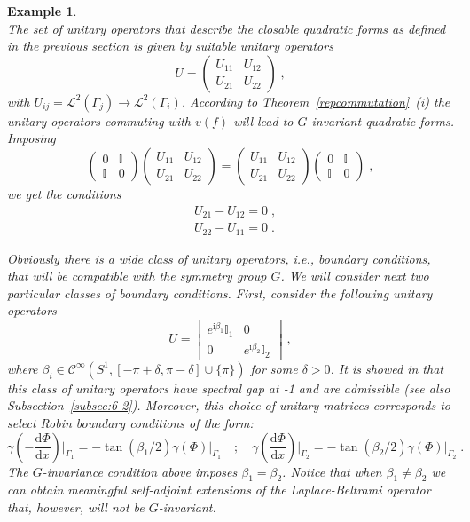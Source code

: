 \documentclass[a4paper,12pt]{amsart}
\renewcommand{\L}{\mathcal{L}}
\renewcommand{\d}{\mathrm{d}}
\newcommand{\C}{\mathcal{C}}
\newcommand{\1}{\mathbb{I}}
\newtheorem{example}[theorem]{Example}
\numberwithin{equation}{section}
\numberwithin{theorem}{section}
\begin{document}
\begin{example}
\[\]
The set of unitary operators that describe the closable quadratic forms as defined in the previous section 
is given by suitable unitary operators 
$$U=\begin{pmatrix} U_{11} & U_{12} \\ U_{21} & U_{22} \end{pmatrix}\;,$$ 
with $U_{ij}=\L^2(\Gamma_j)\to\L^2(\Gamma_i)$. 
According to Theorem~\ref{repcommutation}~(i) the unitary operators commuting 
with $v (f)$ will lead to $G$-invariant quadratic forms. Imposing
$$\begin{pmatrix} 0 & \mathbb{I} \\ \mathbb{I} & 0\end{pmatrix}
\begin{pmatrix} U_{11} & U_{12} \\ U_{21} & U_{22} \end{pmatrix}=\begin{pmatrix} U_{11} & U_{12} \\ U_{21} & U_{22} 
\end{pmatrix}\begin{pmatrix} 0 & \mathbb{I} \\ \mathbb{I} & 0\end{pmatrix}\;,$$
we get the conditions
\begin{align*}
&U_{21}-U_{12}=0\;,\\
&U_{22}-U_{11}=0\;.
\end{align*}

Obviously there is a wide class of unitary operators, i.e., boundary conditions, that will be compatible with the symmetry group $G$. 
We will consider next two particular classes of boundary conditions. 
First, consider the following unitary operators 
\begin{equation}
U=\begin{bmatrix} e^{\mathrm{i}\beta_1}\mathbb{I}_1 & 0\\ 0 & e^{\mathrm{i}\beta_2}\mathbb{I}_2 \end{bmatrix}\;,
\end{equation}
where $\beta_i\in\C^\infty\left(S^1,[-\pi+\delta,\pi-\delta]\cup\{\pi\}\right)$ for some $\delta>0$. It is showed in 
\cite[Sections~3 and 5]{ILP13} that this class of 
unitary operators have spectral gap at -1 and are admissible (see also Subsection~\ref{subsec:6-2}). 
Moreover, this choice of unitary matrices corresponds to select Robin 
boundary conditions of the form:
\begin{equation}
\gamma\left(-\frac{\d\Phi}{\d x}\right)\biggr|_{\Gamma_1}=-\tan(\beta_1/2)\gamma(\Phi)\bigr|_{\Gamma_1}\quad;\quad 
\gamma\left(\frac{\d\Phi}{\d x}\right)\biggr|_{\Gamma_2}=-\tan(\beta_2/2)\gamma(\Phi)\bigr|_{\Gamma_2}\;.
\end{equation}
The $G$-invariance condition above imposes $\beta_1=\beta_2$. Notice that when $\beta_1\neq\beta_2$ 
we can obtain meaningful self-adjoint extensions of the Laplace-Beltrami operator that, however, will not be $G$-invariant.


\end{example}
\end{document}
